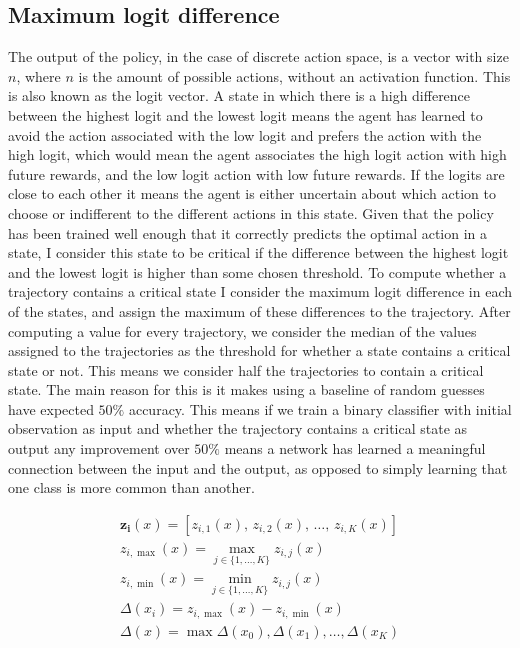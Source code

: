 \documentclass[UKenglish]{uiomasterthesis}
\begin{document}
\subsection{Maximum logit difference}
\label{sec:mld}
The output of the policy, in the case of discrete action space, is a vector with size $n$, where $n$ is the amount of possible actions, without an activation function. This is also known as the logit vector. A state in which there is a high difference between the highest logit and the lowest logit means the agent has learned to avoid the action associated with the low logit and prefers the action with the high logit, which would mean the agent associates the high logit action with high future rewards, and the low logit action with low future rewards. If the logits are close to each other it means the agent is either uncertain about which action to choose or indifferent to the different actions in this state. Given that the policy has been trained well enough that it correctly predicts the optimal action in a state, I consider this state to be critical if the difference between the highest logit and the lowest logit is higher than some chosen threshold.
To compute whether a trajectory contains a critical state I consider the maximum logit difference in each of the states, and assign the maximum of these differences to the trajectory. After computing a value for every trajectory, we consider the median of the values assigned to the trajectories as the threshold for whether a state contains a critical state or not. This means we consider half the trajectories to contain a critical state. The main reason for this is it makes using a baseline of random guesses have expected $50\%$ accuracy. This means if we train a binary classifier with initial observation as input and whether the trajectory contains a critical state as output any improvement over $50\%$ means a network has learned a meaningful connection between the input and the output, as opposed to simply learning that one class is more common than another.

\begin{gather*}
    \mathbf{z_i}(x) = \left[z_{i,1}(x),\, z_{i,2}(x),\, \dots,\, z_{i,K}(x)\right]\\
    z_{i,\max}(x) = \max_{j \in \{1,\dots,K\}} z_{i,j}(x)\\
    z_{i,\min}(x) = \min_{j \in \{1,\dots,K\}} z_{i,j}(x)\\
\Delta(x_i) = z_{i,\max}(x) - z_{i,\min}(x)\\
\Delta(x) = \max{\Delta(x_0),\Delta(x_1), \dots, \Delta(x_K)}
\end{gather*}
\end{document}
